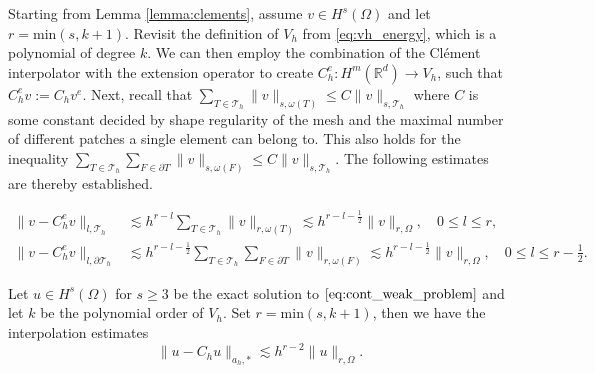 Starting from Lemma \ref{lemma:clements}, assume $v \in H^{s}( \Omega ) $ and let $r = \mathrm{min}(s , k+1) $. Revisit the definition of $V_{h}$ from \eqref{eq:vh_energy}, which is a polynomial of degree $k$. We can then employ the combination of the Clément interpolator with the extension operator to create $C_{h}^{e}: H^{m}( \mathbb{R} ^{d}) \to V_{h}$, such that $C ^{e} _{h} v := C _{h} v^{e}$.
 Next, recall that $ \sum_{T\in \mathcal{T}_{h}}^{} \| v \|_{s,\omega ( T)   }^{  } \le C  \| v \|_{s, \mathcal{T}_{h}   }^{  } $ where $C$ is some constant decided by shape regularity of the mesh and the maximal number of different patches a single element can
 belong to. This also holds for the inequality $ \sum_{T \in \mathcal{T}_{h} }^{} \sum_{F \in \partial T}^{}  \| v \|_{s,\omega ( F)   }^{  } \le C  \| v \|_{s, \mathcal{T}_{h}   }^{  } $.
The following estimates are thereby established.

\begin{align}
    \label{eq:bi_projection_estimates_1}
    \| v - C _{h}^{e} v \|_{  l, \mathcal{T} _{h} }^{  } & \lesssim h^{r-l}\sum_{T \in \mathcal{T}_h} \| v \|_{ r, \omega(T) }^{  } \lesssim  h^{r-l-\frac{1}{2}}  \| v \|_{ r, \Omega  }^{  }, \quad 0\le l\le r, \\
    \label{eq:bi_projection_estimates_2}
\| v - C ^{e}_{h}v \|_{ l, \partial \mathcal{T} _{h} }^{  } & \lesssim h^{r-l-\frac{1}{2}}\sum_{T \in \mathcal{T}_h} \sum_{F \in \partial T} \| v \|_{ r, \omega(F)  }^{  } \lesssim h^{r-l-\frac{1}{2}} \| v \|_{ r, \Omega   }^{  }, \quad 0  \le  l \le   r-\frac{1}{2}.
\end{align}


\begin{lemma}
    \label{lemma:astar_estimate}
    Let $u \in H^{s}( \Omega ) $ for $s\ge 3$ be the exact solution to $\eqref{eq:cont_weak_problem} $ and let $k$ be the polynomial order of $V_{h}$. Set $r = \mathrm{min} ( s, k+1)$, then we have the interpolation estimates
    \begin{equation}
    \|  u - C_{h}u \|_{ a_{h},*  }^{  } \lesssim h^{r-2} \| u \|_{ r, \Omega  }^{  }.
    \end{equation}
\end{lemma}

